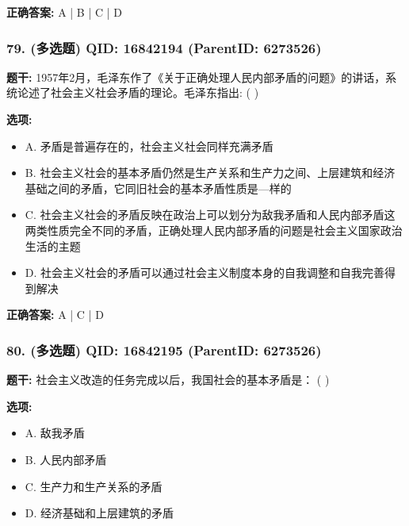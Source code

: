 \documentclass[12pt,UTF8]{ctexart}
\begin{document}
\textbf{正确答案:}
A | B | C | D

\vspace{0.3em}\hrulefill\vspace{0.7em}

\subsubsection*{79. (多选题) \small QID: 16842194 (ParentID: 6273526)}

\textbf{题干:}
1957年2月，毛泽东作了《关于正确处理人民内部矛盾的问题》的讲话，系统论述了社会主义社会矛盾的理论。毛泽东指出: ( )



\textbf{选项:}
\begin{itemize}[leftmargin=*]

  \item A. 矛盾是普遍存在的，社会主义社会同样充满矛盾

  \item B. 社会主义社会的基本矛盾仍然是生产关系和生产力之间、上层建筑和经济基础之间的矛盾，它同旧社会的基本矛盾性质是—样的

  \item C. 社会主义社会的矛盾反映在政治上可以划分为敌我矛盾和人民内部矛盾这两类性质完全不同的矛盾，正确处理人民内部矛盾的问题是社会主义国家政治生活的主题

  \item D. 社会主义社会的矛盾可以通过社会主义制度本身的自我调整和自我完善得到解决

\end{itemize}

\textbf{正确答案:}
A | C | D

\vspace{0.3em}\hrulefill\vspace{0.7em}

\subsubsection*{80. (多选题) \small QID: 16842195 (ParentID: 6273526)}

\textbf{题干:}
社会主义改造的任务完成以后，我国社会的基本矛盾是： ( )



\textbf{选项:}
\begin{itemize}[leftmargin=*]

  \item A. 敌我矛盾

  \item B. 人民内部矛盾

  \item C. 生产力和生产关系的矛盾

  \item D. 经济基础和上层建筑的矛盾

\end{itemize}
\end{document}
